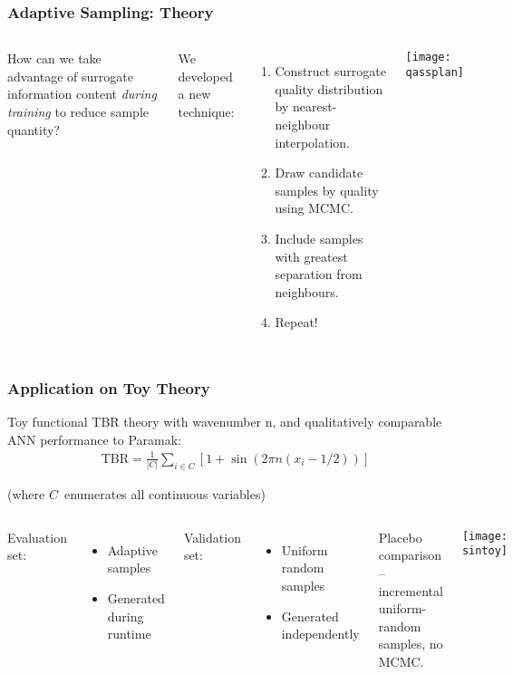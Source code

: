 \begin{frame}
	\frametitle{Adaptive Sampling: Theory}
	 \begin{columns}[onlytextwidth,T]
      \column{\dimexpr\linewidth-6cm-5mm}
        
        How can we take advantage of surrogate information content \textit{during training} to reduce sample quantity? \newline
        
        We developed a new technique:
        \vspace{-5pt}
        \begin{enumerate}
        \item Construct surrogate quality distribution by nearest- neighbour interpolation.
        \item Draw candidate samples by quality using MCMC.
        \item Include samples with greatest separation from neighbours.
        \item Repeat!
        \end{enumerate}
      \column{6cm}
      \texttt{[image: qassplan]}

    \end{columns}
\end{frame}

\begin{frame}
	\frametitle{Application on Toy Theory}
	Toy functional TBR theory with wavenumber n, and qualitatively comparable ANN performance to Paramak:
	\begin{align*}
		\text{TBR} = \frac{1}{|C|}\sum_{i \in C} \left[1 + \sin(2\pi n (x_i - 1/2)) \right]
	\end{align*}

	\vspace{-1em}
	{\footnotesize
		\hfill(where $C$~enumerates all continuous variables)
	}

	\vspace{1em}

	\begin{columns}[T]
		\column{0.5\paperwidth}
		\vspace{0.5em}
		Evaluation set:
		\begin{itemize}
		    \item Adaptive samples
		    \item Generated during runtime
		\end{itemize}
		Validation set:
		\begin{itemize}
		    \item Uniform random samples
		    \item Generated independently
		\end{itemize}
		\vspace{15pt}

		Placebo comparison -- incremental uniform-random samples, no MCMC.


		\column{0.4\paperwidth}
		\hspace{-20pt}\texttt{[image: sintoy]}

	\end{columns}
\end{frame}

